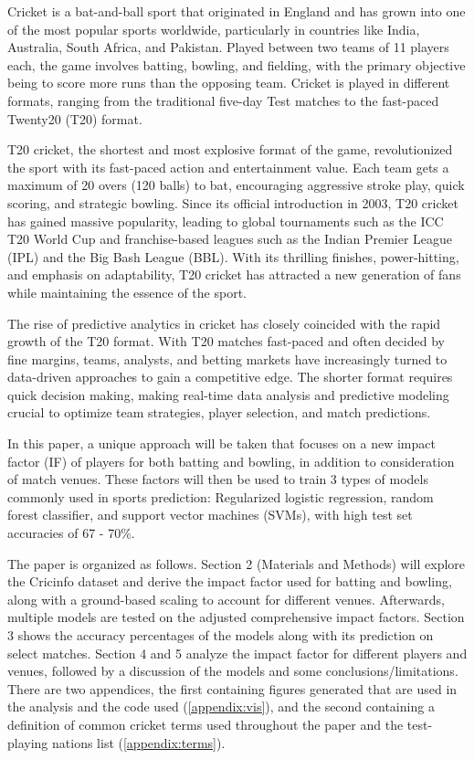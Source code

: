 \documentclass{article}[12pt]
\begin{document}
Cricket is a bat-and-ball sport that originated in England and has grown into one of the most popular sports worldwide, particularly in countries like India, Australia, South Africa, and Pakistan. Played between two teams of 11 players each, the game involves batting, bowling, and fielding, with the primary objective being to score more runs than the opposing team. Cricket is played in different formats, ranging from the traditional five-day Test matches to the fast-paced Twenty20 (T20) format.

T20 cricket, the shortest and most explosive format of the game, revolutionized the sport with its fast-paced action and entertainment value. Each team gets a maximum of 20 overs (120 balls) to bat, encouraging aggressive stroke play, quick scoring, and strategic bowling. Since its official introduction in 2003, T20 cricket has gained massive popularity, leading to global tournaments such as the ICC T20 World Cup and franchise-based leagues such as the Indian Premier League (IPL) and the Big Bash League (BBL). With its thrilling finishes, power-hitting, and emphasis on adaptability, T20 cricket has attracted a new generation of fans while maintaining the essence of the sport.

The rise of predictive analytics in cricket has closely coincided with the rapid growth of the T20 format. With T20 matches fast-paced and often decided by fine margins, teams, analysts, and betting markets have increasingly turned to data-driven approaches to gain a competitive edge. The shorter format requires quick decision making, making real-time data analysis and predictive modeling crucial to optimize team strategies, player selection, and match predictions.

In this paper, a unique approach will be taken that focuses on a new impact factor (IF) of players for both batting and bowling, in addition to consideration of match venues. These factors will then be used to train 3 types of models commonly used in sports prediction: Regularized logistic regression, random forest classifier, and support vector machines (SVMs), with high test set accuracies of 67 - 70\%. \parencite{vistro_2019}

The paper is organized as follows. Section 2 (Materials and Methods) will explore the Cricinfo dataset and derive the impact factor used for batting and bowling, along with a ground-based scaling to account for different venues. Afterwards, multiple models are tested on the adjusted comprehensive impact factors. Section 3 shows the accuracy percentages of the models along with its prediction on select matches. Section 4 and 5 analyze the impact factor for different players and venues, followed by a discussion of the models and some conclusions/limitations. There are two appendices, the first containing figures generated that are used in the analysis and the code used (\ref{appendix:vis}), and the second containing a definition of common cricket terms used throughout the paper and the test-playing nations list (\ref{appendix:terms}).
\end{document}
